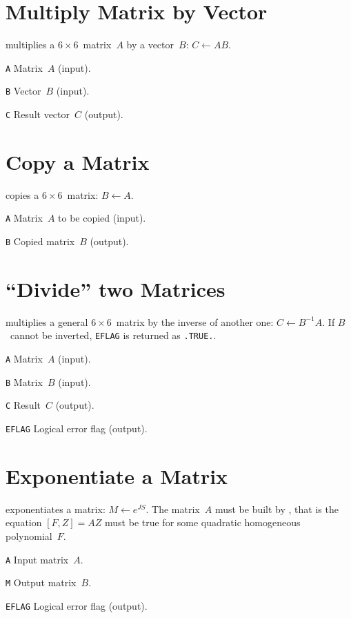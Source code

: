 \section{Multiply Matrix by Vector}
\label{M66BYV}
multiplies a $6 \times 6$~matrix~$A$ by a vector~$B$:
$C \leftarrow A B$.
\begin{mylist}
\item[\tt A]
Matrix~$A$ (input).
\item[\tt B]
Vector~$B$ (input).
\item[\tt C]
Result vector~$C$ (output).
\end{mylist}

\section{Copy a Matrix}
\label{M66CPY}
copies a $6 \times 6$~matrix: $B \leftarrow A$.
\begin{mylist}
\item[\tt A]
Matrix~$A$ to be copied (input).
\item[\tt B]
Copied matrix~$B$ (output).
\end{mylist}

\section{``Divide'' two Matrices}
\label{M66DIV}
multiplies a general $6 \times 6$~matrix by the inverse of another one:
$C \leftarrow B^{-1} A$.
If $B$~cannot be inverted, {\tt EFLAG} is returned as {\tt .TRUE.}.
\begin{mylist}
\item[\tt A]
Matrix~$A$ (input).
\item[\tt B]
Matrix~$B$ (input).
\item[\tt C]
Result~$C$ (output).
\item[\tt EFLAG]
Logical error flag (output).
\end{mylist}

\section{Exponentiate a Matrix}
\label{M66EXP}
exponentiates a matrix: $M \leftarrow e^{JS}$.
The matrix~$A$ must be built by ,
that is the equation $[F,Z] = AZ$ must be true for some quadratic
homogeneous polynomial~$F$.
\begin{mylist}
\item[\tt A]
Input matrix~$A$.
\item[\tt M]
Output matrix~$B$.
\item[\tt EFLAG]
Logical error flag (output).
\end{mylist}

